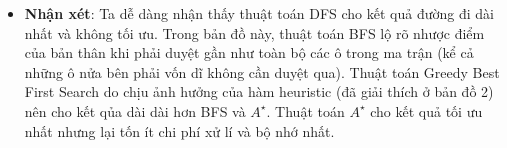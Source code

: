 \documentclass[11pt]{scrartcl} %
\begin{document}
\begin{itemize}
\begin{figure}[h]
\begin{tabular}{cc}
		\end{tabular}
	\end{figure}
	\begin{itemize}
		\item \textbf{Nhận xét}: Ta dễ dàng nhận thấy thuật toán DFS cho kết quả đường đi dài nhất và không tối ưu. Trong bản đồ này, thuật toán BFS lộ rõ nhược điểm của bản thân khi phải duyệt gần như toàn bộ các ô trong ma trận (kể cả những ô nửa bên phải vốn dĩ không cần duyệt qua). Thuật toán Greedy Best First Search do chịu ảnh hưởng của hàm heuristic (đã giải thích ở bản đồ 2) nên cho kết qủa dài dài hơn BFS và $A^{\star}$. Thuật toán  $A^{\star}$ cho kết quả tối ưu nhất nhưng lại tốn ít chi phí xử lí và bộ nhớ nhất.
	\end{itemize}
	


\end{itemize}
\end{document}
